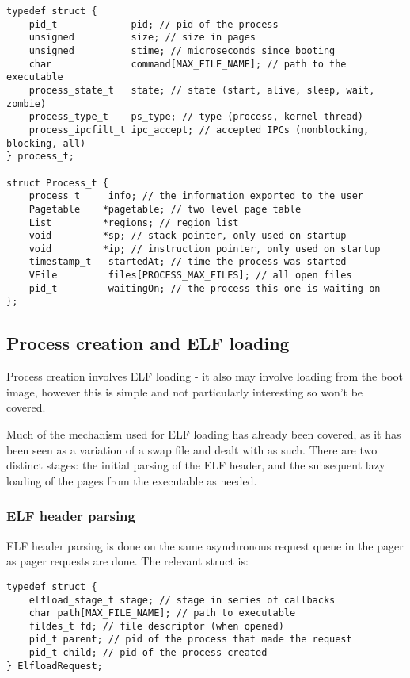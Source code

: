 \documentclass[12pt,english]{article}
\begin{document}
\begin{verbatim}
typedef struct {
    pid_t             pid; // pid of the process
    unsigned          size; // size in pages
    unsigned          stime; // microseconds since booting
    char              command[MAX_FILE_NAME]; // path to the executable
    process_state_t   state; // state (start, alive, sleep, wait, zombie)
    process_type_t    ps_type; // type (process, kernel thread)
    process_ipcfilt_t ipc_accept; // accepted IPCs (nonblocking, blocking, all)
} process_t;

struct Process_t {
    process_t     info; // the information exported to the user
    Pagetable    *pagetable; // two level page table
    List         *regions; // region list
    void         *sp; // stack pointer, only used on startup
    void         *ip; // instruction pointer, only used on startup
    timestamp_t   startedAt; // time the process was started
    VFile         files[PROCESS_MAX_FILES]; // all open files
    pid_t         waitingOn; // the process this one is waiting on
};
\end{verbatim}

\subsection{Process creation and ELF loading} \label{sub:elf_loading}

Process creation involves ELF loading - it also may involve loading from the boot image, however this is simple and not particularly interesting so won't be covered.

Much of the mechanism used for ELF loading has already been covered, as it has been seen as a variation of a swap file and dealt with as such.  There are two distinct stages: the initial parsing of the ELF header, and the subsequent lazy loading of the pages from the executable as needed.

\subsubsection{ELF header parsing}

ELF header parsing is done on the same asynchronous request queue in the pager as pager requests are done.  The relevant struct is:

\begin{verbatim}
typedef struct {
    elfload_stage_t stage; // stage in series of callbacks
    char path[MAX_FILE_NAME]; // path to executable
    fildes_t fd; // file descriptor (when opened)
    pid_t parent; // pid of the process that made the request
    pid_t child; // pid of the process created
} ElfloadRequest;
\end{verbatim}
\end{document}
